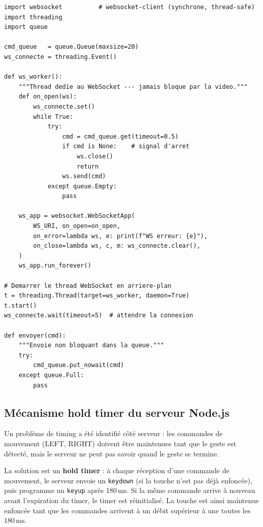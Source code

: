 \documentclass[12pt, a4paper]{article}
\newcommand{\code}[1]{\texttt{\small #1}}
\begin{document}
\begin{lstlisting}[caption={Architecture deux threads pour le WebSocket (extrait de
                   \texttt{5\_jouer\_avec\_cnn.py} --- script expérimental)},
                   label=lst:threading]
import websocket          # websocket-client (synchrone, thread-safe)
import threading
import queue

cmd_queue   = queue.Queue(maxsize=20)
ws_connecte = threading.Event()

def ws_worker():
    """Thread dedie au WebSocket --- jamais bloque par la video."""
    def on_open(ws):
        ws_connecte.set()
        while True:
            try:
                cmd = cmd_queue.get(timeout=0.5)
                if cmd is None:    # signal d'arret
                    ws.close()
                    return
                ws.send(cmd)
            except queue.Empty:
                pass

    ws_app = websocket.WebSocketApp(
        WS_URI, on_open=on_open,
        on_error=lambda ws, e: print(f"WS erreur: {e}"),
        on_close=lambda ws, c, m: ws_connecte.clear(),
    )
    ws_app.run_forever()

# Demarrer le thread WebSocket en arriere-plan
t = threading.Thread(target=ws_worker, daemon=True)
t.start()
ws_connecte.wait(timeout=5)  # attendre la connexion

def envoyer(cmd):
    """Envoie non bloquant dans la queue."""
    try:
        cmd_queue.put_nowait(cmd)
    except queue.Full:
        pass
\end{lstlisting}

\subsection{Mécanisme hold timer du serveur Node.js}

Un problème de timing a été identifié côté serveur : les commandes de mouvement
(LEFT, RIGHT) doivent être maintenues tant que le geste est détecté, mais
le serveur ne peut pas savoir quand le geste se termine.

La solution est un \textbf{hold timer} : à chaque réception d'une commande
de mouvement, le serveur envoie un \code{keydown} (si la touche n'est pas
déjà enfoncée), puis programme un \code{keyup} après 180\,ms. Si la même
commande arrive à nouveau avant l'expiration du timer, le timer est réinitialisé.
La touche est ainsi maintenue enfoncée tant que les commandes arrivent à un
débit supérieur à une toutes les 180\,ms.
\end{document}
